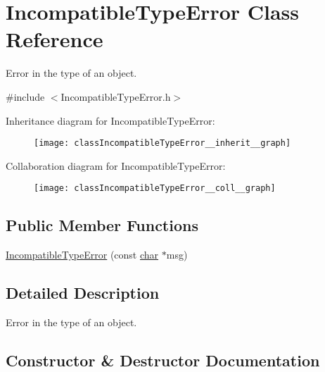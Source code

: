 \hypertarget{classIncompatibleTypeError}{}\section{Incompatible\+Type\+Error Class Reference}
\label{classIncompatibleTypeError}


Error in the type of an object.  




{\ttfamily \#include $<$Incompatible\+Type\+Error.\+h$>$}



Inheritance diagram for Incompatible\+Type\+Error\+:\nopagebreak
\begin{figure}[H]
\begin{center}
\leavevmode
\texttt{[image: classIncompatibleTypeError\_\_inherit\_\_graph]}
\end{center}
\end{figure}


Collaboration diagram for Incompatible\+Type\+Error\+:\nopagebreak
\begin{figure}[H]
\begin{center}
\leavevmode
\texttt{[image: classIncompatibleTypeError\_\_coll\_\_graph]}
\end{center}
\end{figure}
\subsection*{Public Member Functions}
\begin{DoxyCompactItemize}
\item 
\hyperlink{classIncompatibleTypeError_ab0d9dcc1463ee375b7c0d34d1e5e99d5}{Incompatible\+Type\+Error} (const \hyperlink{CMakeCache_8txt_afe71f11dacb15682cdc012f7208e6e09}{char} $\ast$msg)
\end{DoxyCompactItemize}


\subsection{Detailed Description}
Error in the type of an object. 

\subsection{Constructor \& Destructor Documentation}

